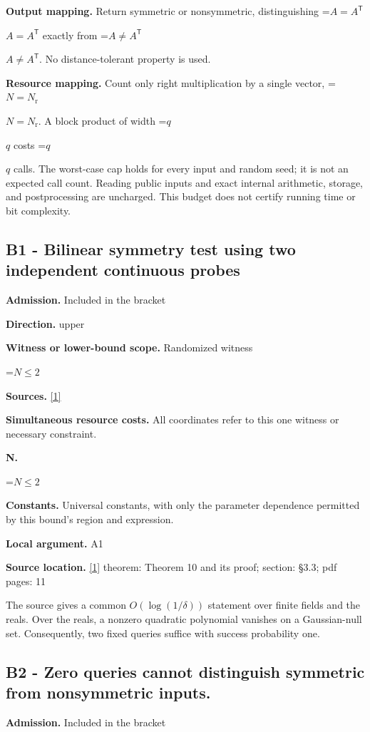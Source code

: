 \documentclass[10pt,a4paper]{article}
\newcommand{\AtlasMath}[1]{\par\begingroup\centering\setbox0=\hbox{$\displaystyle #1$}\ifdim\wd0>1.4\linewidth\typeout{ATLAS WIDE FORMULA: \the\wd0}\fi\ifdim\wd0>\linewidth\resizebox{\linewidth}{!}{\box0}\else\box0\fi\par\endgroup}
\newcommand{\AtlasInlineMath}[1]{\begingroup\setbox0=\hbox{$#1$}\ifdim\wd0>.4\linewidth\endgroup\AtlasMath{#1}\else\endgroup$#1$\fi}
\begin{document}
\textbf{Output mapping.} Return symmetric or nonsymmetric, distinguishing \AtlasInlineMath{A=A^{\mathsf T}} exactly from \AtlasInlineMath{A\ne A^{\mathsf T}}. No distance-tolerant property is used.

\textbf{Resource mapping.} Count only right multiplication by a single vector, \AtlasInlineMath{N=N_{\mathrm r}}. A block product of width \AtlasInlineMath{q} costs \AtlasInlineMath{q} calls. The worst-case cap holds for every input and random seed; it is not an expected call count. Reading public inputs and exact internal arithmetic, storage, and postprocessing are uncharged. This budget does not certify running time or bit complexity.

\subsection{B1 - Bilinear symmetry test using two independent continuous probes}
\textbf{Admission.} Included in the bracket

\textbf{Direction.} upper

\textbf{Witness or lower-bound scope.} Randomized witness

\AtlasMath{N\le 2}
\textbf{Sources.} \href{https://drops.dagstuhl.de/opus/volltexte/2019/10670/pdf/LIPIcs-ICALP-2019-94.pdf}{[1]}

\textbf{Simultaneous resource costs.} All coordinates refer to this one witness or necessary constraint.

\textbf{N.}

\AtlasMath{N\le 2}
\textbf{Constants.} Universal constants, with only the parameter dependence permitted by this bound’s region and expression.

\textbf{Local argument.} A1

\textbf{Source location.} \href{https://drops.dagstuhl.de/opus/volltexte/2019/10670/pdf/LIPIcs-ICALP-2019-94.pdf}{[1]} theorem: Theorem 10 and its proof; section: §3.3; pdf pages: 11

The source gives a common $O(\log(1/\delta ))$ statement over finite fields and the reals. Over the reals, a nonzero quadratic polynomial vanishes on a Gaussian-null set. Consequently, two fixed queries suffice with success probability one.

\subsection{B2 - Zero queries cannot distinguish symmetric from nonsymmetric inputs.}
\textbf{Admission.} Included in the bracket
\end{document}
